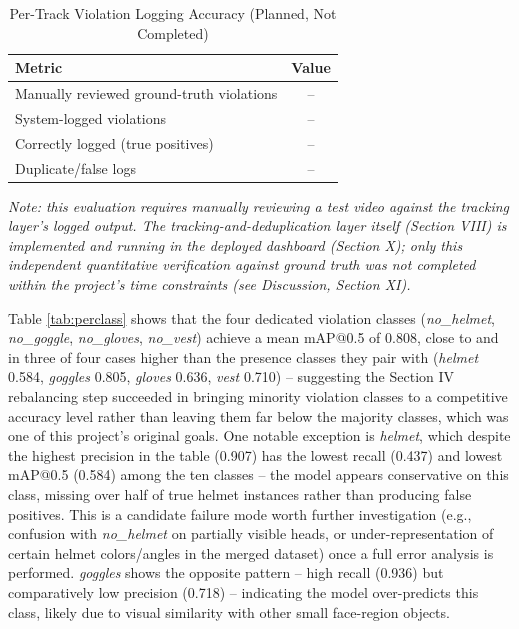 \documentclass[conference]{IEEEtran}
\begin{document}
\begin{table}[htbp]
\caption{Per-Track Violation Logging Accuracy (Planned, Not Completed)}
\begin{center}
\begin{tabular}{lc}
\toprule
\textbf{Metric} & \textbf{Value} \\
\midrule
Manually reviewed ground-truth violations & -- \\
System-logged violations & -- \\
Correctly logged (true positives) & -- \\
Duplicate/false logs & -- \\
\bottomrule
\end{tabular}
\label{tab:tracking}
\end{center}
\end{table}
\textit{Note: this evaluation requires manually reviewing a test video against the tracking layer's logged output. The tracking-and-deduplication layer itself (Section VIII) is implemented and running in the deployed dashboard (Section X); only this independent quantitative verification against ground truth was not completed within the project's time constraints (see Discussion, Section XI).}

Table \ref{tab:perclass} shows that the four dedicated violation classes (\textit{no\_helmet}, \textit{no\_goggle}, \textit{no\_gloves}, \textit{no\_vest}) achieve a mean mAP@0.5 of 0.808, close to and in three of four cases higher than the presence classes they pair with (\textit{helmet} 0.584, \textit{goggles} 0.805, \textit{gloves} 0.636, \textit{vest} 0.710) -- suggesting the Section IV rebalancing step succeeded in bringing minority violation classes to a competitive accuracy level rather than leaving them far below the majority classes, which was one of this project's original goals. One notable exception is \textit{helmet}, which despite the highest precision in the table (0.907) has the lowest recall (0.437) and lowest mAP@0.5 (0.584) among the ten classes -- the model appears conservative on this class, missing over half of true helmet instances rather than producing false positives. This is a candidate failure mode worth further investigation (e.g., confusion with \textit{no\_helmet} on partially visible heads, or under-representation of certain helmet colors/angles in the merged dataset) once a full error analysis is performed. \textit{goggles} shows the opposite pattern -- high recall (0.936) but comparatively low precision (0.718) -- indicating the model over-predicts this class, likely due to visual similarity with other small face-region objects.
\end{document}
